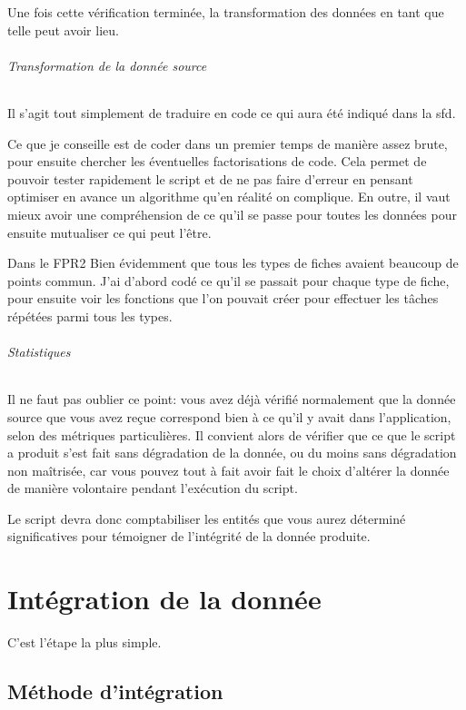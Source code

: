 \documentclass{book}
\begin{document}
Une fois cette vérification terminée, la transformation des données en tant que telle peut avoir lieu.
	
\subparagraph{Transformation de la donnée source}

Il s'agit tout simplement de traduire en code ce qui aura été indiqué dans la \gls{sfd}.

Ce que je conseille est de coder dans un premier temps de manière assez brute, pour ensuite chercher les éventuelles factorisations de code. Cela permet de pouvoir tester rapidement le script et de ne pas faire d'erreur en pensant optimiser en avance un algorithme qu'en réalité on complique. En outre, il vaut mieux avoir une compréhension de ce qu'il se passe pour toutes les données pour ensuite mutualiser ce qui peut l'être.

\begin{bclogo}[arrondi = 0.1, couleur = blue!10, logo = \bcinfo]{Dans le FPR2}
Bien évidemment que tous les types de fiches avaient beaucoup de points commun. J'ai d'abord codé ce qu'il se passait pour chaque type de fiche, pour ensuite voir les fonctions que l'on pouvait créer pour effectuer les tâches répétées parmi tous les types.
\end{bclogo}

\subparagraph{Statistiques}

Il ne faut pas oublier ce point: vous avez déjà vérifié normalement que la donnée source que vous avez reçue correspond bien à ce qu'il y avait dans l'application, selon des métriques particulières. Il convient alors de vérifier que ce que le script a produit s'est fait sans dégradation de la donnée, ou du moins sans dégradation non maîtrisée, car vous pouvez tout à fait avoir fait le choix d'altérer la donnée de manière volontaire pendant l'exécution du script.

Le script devra donc comptabiliser les entités que vous aurez déterminé significatives pour témoigner de l'intégrité de la donnée produite.

\chapter{Intégration de la donnée}

C'est l'étape la plus simple.

\section{Méthode d'intégration}
\end{document}
